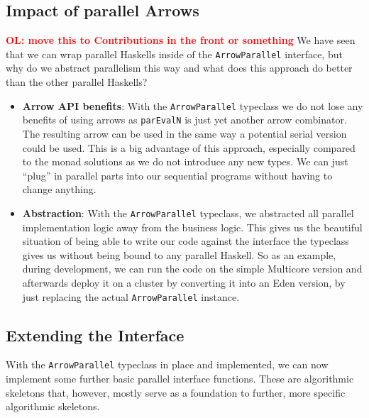\documentclass{jfp1}
\newcommand{\inlinecode}[1]{\texttt{#1}}
\newcommand{\comm}[2]{\textcolor{red}{\bfseries #1: #2}}
\newcommand{\olcomment}[1]{\comm{OL}{#1}}
\begin{document}
\subsection{Impact of parallel Arrows}
\olcomment{move this to Contributions in the front or something}
We have seen that we can wrap parallel Haskells inside of the \inlinecode{ArrowParallel} interface, but why do we abstract parallelism this way and what does this approach do better than the other parallel Haskells?
\begin{itemize}
	\item \textbf{Arrow API benefits}:
	With the \inlinecode{ArrowParallel} typeclass we do not lose any benefits of using arrows as \inlinecode{parEvalN} is just yet another arrow combinator. The resulting arrow can be used in the same way a potential serial version could be used. This is a big advantage of this approach, especially compared to the monad solutions as we do not introduce any new types. We can just \enquote{plug} in parallel parts into our sequential programs without having to change anything.
	\item \textbf{Abstraction}:
	With the \inlinecode{ArrowParallel} typeclass, we abstracted all parallel implementation logic away from the business logic. This gives us the beautiful situation of being able to write our code against the interface the typeclass gives us without being bound to any parallel Haskell. So as an example, during development, we can run the code on the simple Multicore version and afterwards deploy it on a cluster by converting it into an Eden version, by just replacing the actual \inlinecode{ArrowParallel} instance.
\end{itemize}


	\subsection{Extending the Interface}
\label{sec:extending-interface}
With the \inlinecode{ArrowParallel} typeclass in place and implemented, we can now implement some further basic parallel interface functions. These are algorithmic skeletons that, however, mostly serve as a foundation to further, more specific algorithmic skeletons.
\end{document}
